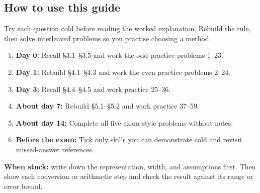 \documentclass[11pt]{article}
\begin{document}
\begin{keepsection}
\section{How to use this guide}

Try each question cold before reading the worked explanation. Rebuild the rule, then solve interleaved problems so you practise choosing a method.

\begin{enumerate}
\item \textbf{Day 0:} Recall §3.1–§3.5 and work the odd practice problems 1–23.
\item \textbf{Day 1:} Rebuild §4.1–§4.3 and work the even practice problems 2–24.
\item \textbf{Day 3:} Recall §4.4–§4.5 and work practice 25–36.
\item \textbf{About day 7:} Rebuild §5.1–§5.2 and work practice 37–59.
\item \textbf{About day 14:} Complete all five exam-style problems without notes.
\item \textbf{Before the exam:} Tick only skills you can demonstrate cold and revisit missed-answer references.
\end{enumerate}

\begin{notebox}\textbf{When stuck:} write down the representation, width, and assumptions first. Then show each conversion or arithmetic step and check the result against its range or error bound.\end{notebox}
\end{keepsection}
\end{document}
